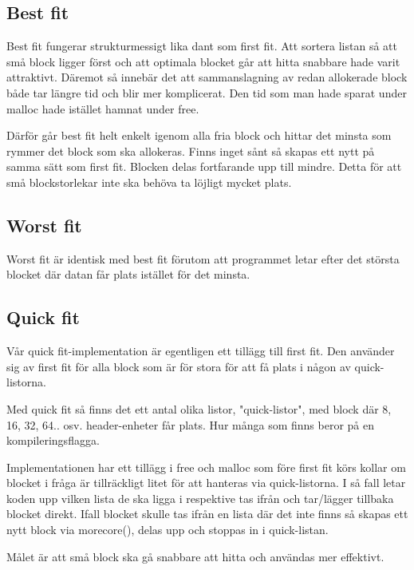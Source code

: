 \documentclass[a4paper,11pt]{article}
\begin{document}
\subsection*{Best fit}

Best fit fungerar strukturmessigt lika dant som first fit. Att sortera listan så att små block ligger först och att optimala blocket går att hitta snabbare hade varit attraktivt. Däremot så innebär det att sammanslagning av redan allokerade block både tar längre tid och blir mer komplicerat. Den tid som man hade sparat under malloc hade istället hamnat under free.

Därför går best fit helt enkelt igenom alla fria block och hittar det minsta som rymmer det block som ska allokeras. Finns inget sånt så skapas ett nytt på samma sätt som first fit. Blocken delas fortfarande upp till mindre. Detta för att små blockstorlekar inte ska behöva ta löjligt mycket plats.

\subsection*{Worst fit}

Worst fit är identisk med best fit förutom att programmet letar efter det största blocket där datan får plats istället för det minsta.

\subsection*{Quick fit}

Vår quick fit-implementation är egentligen ett tillägg till first fit. Den använder sig av first fit för alla block som är för stora för att få plats i någon av quick-listorna.

Med quick fit så finns det ett antal olika listor, "quick-listor", med block där 8, 16, 32, 64.. osv. header-enheter får plats. Hur många som finns beror på en kompileringsflagga.

Implementationen har ett tillägg i free och malloc som före first fit körs kollar om blocket i fråga är tillräckligt litet för att hanteras via quick-listorna. I så fall letar koden upp vilken lista de ska ligga i respektive tas ifrån och tar/lägger tillbaka blocket direkt. Ifall blocket skulle tas ifrån en lista där det inte finns så skapas ett nytt block via morecore(), delas upp och stoppas in i quick-listan.

Målet är att små block ska gå snabbare att hitta och användas mer effektivt.
\end{document}
